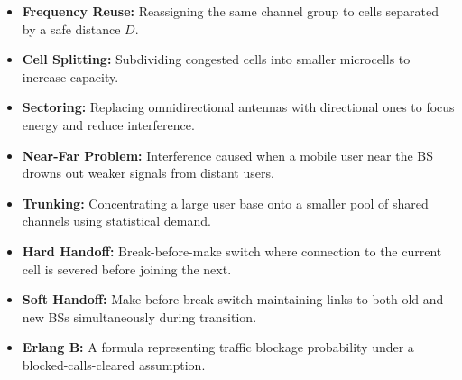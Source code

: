 \documentclass[12pt,a4paper]{article}
\begin{document}
\begin{tcolorbox}[defbox, title={\textbf{One-Line Definitions}}]
\begin{itemize}[leftmargin=*, itemsep=2.5pt, topsep=0pt]
  \item \textbf{Frequency Reuse:} Reassigning the same channel group to cells separated by a safe distance $D$.
  \item \textbf{Cell Splitting:} Subdividing congested cells into smaller microcells to increase capacity.
  \item \textbf{Sectoring:} Replacing omnidirectional antennas with directional ones to focus energy and reduce interference.
  \item \textbf{Near-Far Problem:} Interference caused when a mobile user near the BS drowns out weaker signals from distant users.
  \item \textbf{Trunking:} Concentrating a large user base onto a smaller pool of shared channels using statistical demand.
  \item \textbf{Hard Handoff:} Break-before-make switch where connection to the current cell is severed before joining the next.
  \item \textbf{Soft Handoff:} Make-before-break switch maintaining links to both old and new BSs simultaneously during transition.
  \item \textbf{Erlang B:} A formula representing traffic blockage probability under a blocked-calls-cleared assumption.
\end{itemize}
\end{tcolorbox}
\end{document}
